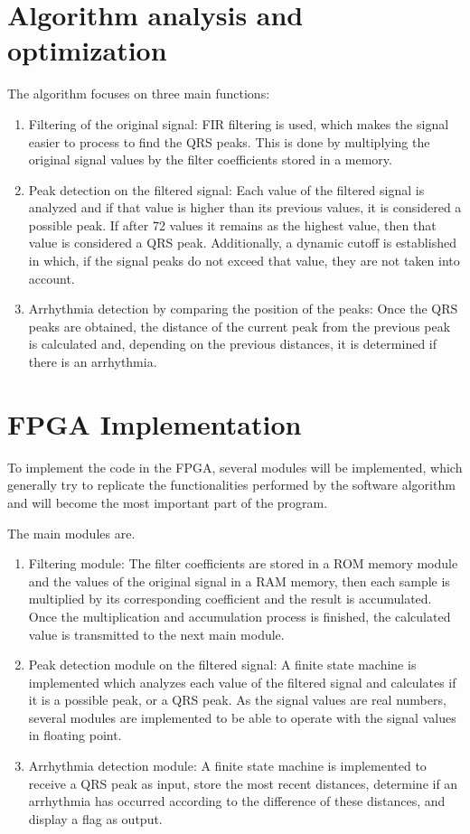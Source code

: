 \section*{Algorithm analysis and optimization}
The algorithm focuses on three main functions:
\begin{enumerate}
	\item Filtering of the original signal: FIR filtering is used\cite{FIR}, which makes the signal easier to process to find the QRS peaks. This is done by multiplying the original signal values by the filter coefficients stored in a memory.
	\item Peak detection on the filtered signal: Each value of the filtered signal is analyzed and if that value is higher than its previous values, it is considered a possible peak. If after 72 values it remains as the highest value, then that value is considered a QRS peak. Additionally, a dynamic cutoff is established in which, if the signal peaks do not exceed that value, they are not taken into account.
	\item Arrhythmia detection by comparing the position of the peaks: Once the QRS peaks are obtained, the distance of the current peak from the previous peak is calculated and, depending on the previous distances, it is determined if there is an arrhythmia.
\end{enumerate}

\section*{FPGA Implementation}
To implement the code in the FPGA, several modules will be implemented, which generally try to replicate the functionalities performed by the software algorithm and will become the most important part of the program.  

The main modules are.

	\begin{enumerate}
		\item Filtering module: The filter coefficients are stored in a ROM memory module and the values of the original signal in a RAM memory, then each sample is multiplied by its corresponding coefficient and the result is accumulated. Once the multiplication and accumulation process is finished, the calculated value is transmitted to the next main module.
		\item Peak detection module on the filtered signal: A finite state machine is implemented which analyzes each value of the filtered signal and calculates if it is a possible peak, or a QRS peak. As the signal values are real numbers, several modules are implemented to be able to operate with the signal values in floating point. 
		\item Arrhythmia detection module: A finite state machine is implemented to receive a QRS peak as input, store the most recent distances, determine if an arrhythmia has occurred according to the difference of these distances, and display a flag as output.
	\end{enumerate}
	
